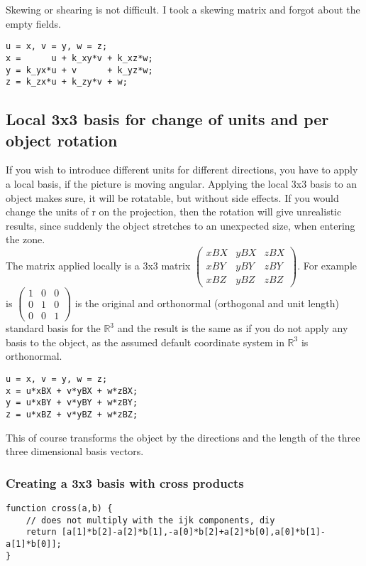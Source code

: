 \documentclass[a4paper]{article}
\begin{document}
\begin{PropositionOpt4}
Skewing or shearing is not difficult. I took a skewing matrix and forgot about the empty fields.

\begin{lstlisting}
u = x, v = y, w = z;
x =      u + k_xy*v + k_xz*w;
y = k_yx*u + v      + k_yz*w;
z = k_zx*u + k_zy*v + w;
\end{lstlisting}

\subsection{Local 3x3 basis for change of units and per object rotation}

If you wish to introduce different units for different directions, you have to apply a local basis, if the picture is moving angular. Applying the local 3x3
basis to an object makes sure, it will be rotatable, but without side effects. If you would change the units of r on the projection, then the rotation will give unrealistic results, since suddenly the object stretches to an unexpected size, when entering the zone. \\

The matrix applied locally is a 3x3 matrix $\begin{pmatrix} xBX & yBX & zBX\\ xBY & yBY & zBY\\ xBZ & yBZ & zBZ\end{pmatrix}$.
For example is $\begin{pmatrix} 1 & 0 & 0\\ 0 & 1 & 0\\ 0 & 0 & 1\end{pmatrix}$ is the original and orthonormal (orthogonal and unit length) standard basis for the $\mathbb{R}^{3}$ and the result is the same as if you do not apply any basis to the object, as the assumed default coordinate system in $\mathbb{R}^{3}$ is orthonormal.\\

\begin{lstlisting}
u = x, v = y, w = z;
x = u*xBX + v*yBX + w*zBX;
y = u*xBY + v*yBY + w*zBY;
z = u*xBZ + v*yBZ + w*zBZ;
\end{lstlisting}

This of course transforms the object by the directions and the length of the three three dimensional basis vectors.

\subsubsection{Creating a 3x3 basis with cross products}
\begin{lstlisting}
function cross(a,b) {
    // does not multiply with the ijk components, diy
    return [a[1]*b[2]-a[2]*b[1],-a[0]*b[2]+a[2]*b[0],a[0]*b[1]-a[1]*b[0]];
}
\end{lstlisting}


\end{PropositionOpt4}
\end{document}
